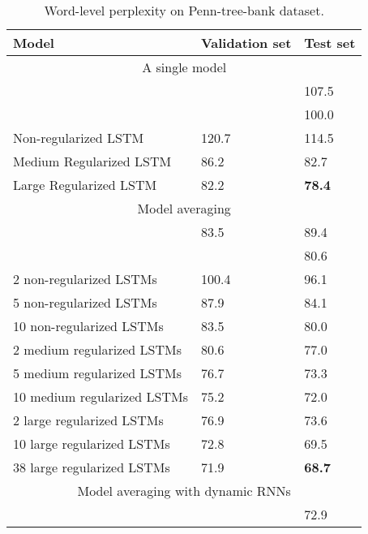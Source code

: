 \documentclass{article}
\begin{document}
\begin{table}[t]
  \small
  \centering
  \renewcommand{\arraystretch}{1.15}
  \begin{tabular}{lll}
    \hline
     Model & Validation set & Test set \\
    \hline
    \multicolumn{3}{c}{A single model} \\
    \hline
    \cite{pascanu2013construct} & & 107.5 \\
    \cite{chenglanguage} & & 100.0 \\
    Non-regularized LSTM & 120.7 & 114.5 \\
    Medium Regularized LSTM & 86.2 & 82.7 \\
    Large Regularized LSTM & 82.2 & {\bf 78.4} \\
    \hline
    \multicolumn{3}{c}{Model averaging} \\
    \hline
    \cite{mikolov2012statistical} & 83.5 & 89.4 \\
    \cite{chenglanguage} & & 80.6 \\
    2 non-regularized LSTMs & 100.4 & 96.1 \\
    5 non-regularized LSTMs & 87.9 & 84.1 \\
    10 non-regularized LSTMs & 83.5 & 80.0 \\
    2 medium regularized LSTMs & 80.6 & 77.0 \\
    5 medium regularized LSTMs & 76.7 & 73.3 \\
    10 medium regularized LSTMs & 75.2 & 72.0 \\
    2 large regularized LSTMs & 76.9 & 73.6 \\
    10 large regularized LSTMs & 72.8 & 69.5 \\
    38 large regularized LSTMs & 71.9 & {\bf 68.7} \\
    \hline
    \multicolumn{3}{c}{Model averaging with dynamic RNNs} \\
    \hline
    \cite{mikolov2012context} & & 72.9 \\
    \hline
  \end{tabular}
  \caption{Word-level perplexity on Penn-tree-bank dataset.}
  \label{tab:ptb}
\end{table}
\end{document}
